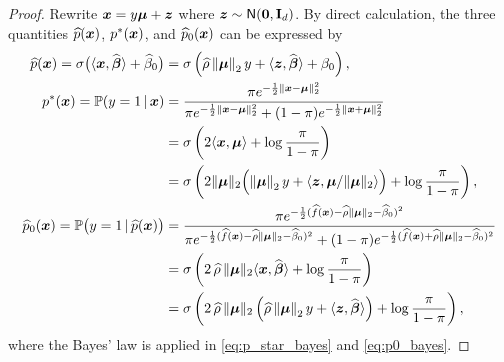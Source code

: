 \begin{proof}
    Rewrite $\text{\boldmath $x$} = y\text{\boldmath $\mu$} + \text{\boldmath $z$}$ where $\text{\boldmath $z$} \sim {\sf N}(\mathrm{\bf 0}, \mathrm{\bf I}_d)$. By direct calculation, the three quantities $\widehat p(\text{\boldmath $x$})$, $p^*(\text{\boldmath $x$})$, and $\widehat p_0(\text{\boldmath $x$})$ can be expressed by
    \begin{align}
        \hat p(\xx) = \sigma\bigl( \< \xx, \hat\vbeta \> + \hat\beta_0 \bigr) 
        & = \sigma\left( \hat \rho \norm{\bmu}_2 y + \< \zz, \hat\vbeta \> +\beta_0 \right),
        \label{eq:p_hat_exp}
        \\
        p^*(\xx) = \P( y = 1 \,|\, \xx )
        & = \frac{\pi e^{-\frac12 \| \xx - \bmu \|_2^2} }{\pi e^{-\frac12 \| \xx - \bmu \|_2^2} + (1 - \pi) e^{-\frac12 \| \xx + \bmu \|_2^2}} 
        \label{eq:p_star_bayes}
        \\
        & = \sigma \left( 2\< \xx, \bmu \> + \log\frac{\pi}{1 - \pi} \right)  \notag \\
        & = \sigma \left( 2 \|\bmu\|_2 \Bigl( \norm{\bmu}_2 y + \< \zz, \bmu/\|\bmu\|_2 \> \Bigr)  + \log\frac{\pi}{1 - \pi} \right),
        \label{eq:p_star_exp}
        \\
        \hat p_0(\xx) = \P \bigl( y = 1 \,|\, \hat p(\xx) \bigr)
        & = \frac{\pi e^{-\frac12 (\hat f(\xx) - \hat\rho\|\bmu\|_2 - \hat\beta_0)^2} }{\pi e^{-\frac12 (\hat f(\xx) - \hat\rho\|\bmu\|_2 - \hat\beta_0)^2} + (1 - \pi) e^{-\frac12 (\hat f(\xx) + \hat\rho\|\bmu\|_2 - \hat\beta_0)^2} } 
        \label{eq:p0_bayes}
        \\
        & = \sigma \left( 2 \, \hat\rho \, \|\bmu\|_2 \< \xx, \hat\bbeta \> + \log\frac{\pi}{1 - \pi} \right) \notag \\
        & = \sigma \left( 2 \, \hat\rho \, \|\bmu\|_2 \left(\hat \rho \norm{\bmu}_2 y + \< \zz, \hat\vbeta \> \right) + \log\frac{\pi}{1 - \pi} \right),
        \label{eq:p0_exp}
    \end{align}
    where the Bayes' law is applied in \cref{eq:p_star_bayes} and \eqref{eq:p0_bayes}.


\end{proof}
